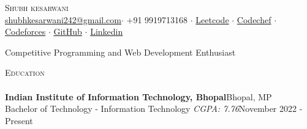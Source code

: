 \documentclass[a4paper]{article}
\newcommand{\lineunder} {
    \vspace*{-8pt} \\
    \hspace*{-18pt} \hrulefill \\
}
\newcommand{\header} [1] {
    {\hspace*{-18pt}\vspace*{6pt} \textsc{#1}}
    \vspace*{-6pt} \lineunder
}
\begin{document}
\vspace*{-40pt}

    

\vspace*{-9pt}
\begin{center}
	{\Huge \scshape {Shubh kesarwani}}\\
	\vspace{2mm}
\href{mailto:shubhkesarwani242@gmail.com}{shubhkesarwani242@gmail.com}$\cdot$ 
+91 9919713168 $\cdot$
\href{https://leetcode.com/u/Shubhkesarwani02/}{Leetcode} $\cdot$
\href{https://www.codechef.com/users/shubhkesarwani}{Codechef} $\cdot$ 
\href{https://codeforces.com/profile/Shubhkesarwani02}{Codeforces} $\cdot$
\href{https://github.com/Shubhkesarwani02}{GitHub} $\cdot$ \href{https:/www.linkedin.com/in/shubh-kesarwani-537b30256/}{Linkedin}\\
\end{center}

\begin{center}
 Competitive Programming and Web Development Enthusiast\\
\end{center}

\header{Education}
\vspace{0mm}
\textbf{Indian Institute of Information Technology, Bhopal}\hfill Bhopal, MP\\
Bachelor of Technology - Information Technology \textit{CGPA: 7.76}\hfill November 2022 - Present\\
\vspace{4mm}
\end{document}
